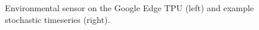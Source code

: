 \begin{figure}[ht]
\vskip 0.2in
\begin{center}
\caption{Environmental sensor on the Google Edge TPU (left) and example stochastic timeseries (right).}
\label{fig:iot_sensor}
\end{center}
\vskip -0.2in
\end{figure}
